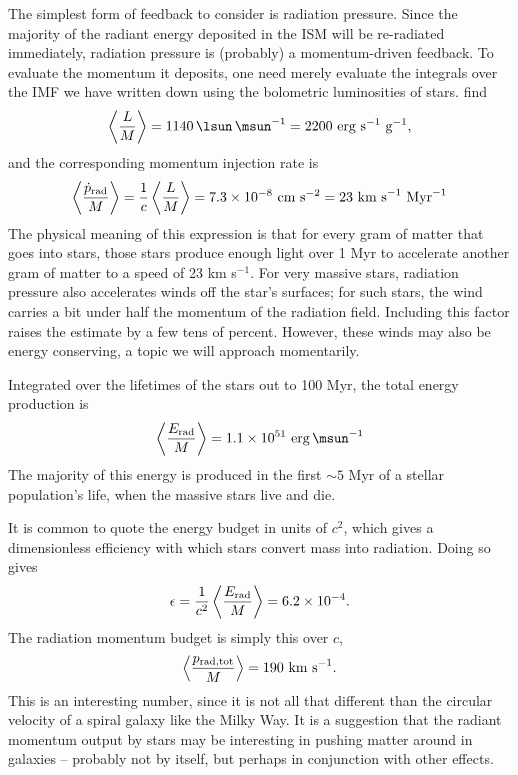 The simplest form of feedback to consider is radiation pressure. Since the majority of the radiant energy deposited in the ISM will be re-radiated immediately, radiation pressure is (probably) a momentum-driven feedback. To evaluate the momentum it deposits, one need merely evaluate the integrals over the IMF we have written down using the bolometric luminosities of stars. \citet{murray10b} find
\begin{equation}
\left\langle \frac{L}{M}\right \rangle = 1140 \,\lsun\,\msun^{-1} = 2200\mbox{ erg s}^{-1}\mbox{ g}^{-1},
\end{equation}
and the corresponding momentum injection rate is
\begin{equation}
\left\langle \frac{\dot{p}_{\rm rad}}{M}\right \rangle = \frac{1}{c} \left\langle \frac{L}{M}\right \rangle = 7.3\times 10^{-8}\mbox{ cm s}^{-2} = 23\mbox{ km s}^{-1}\mbox{ Myr}^{-1}
\end{equation}
The physical meaning of this expression is that for every gram of matter that goes into stars, those stars produce enough light over 1 Myr to accelerate another gram of matter to a speed of 23 km s$^{-1}$. For very massive stars, radiation pressure also accelerates winds off the star's surfaces; for such stars, the wind carries a bit under half the momentum of the radiation field. Including this factor raises the estimate by a few tens of percent.  However, these winds may also be energy conserving, a topic we will approach momentarily.

Integrated over the lifetimes of the stars out to 100 Myr, the total energy production is
\begin{equation}
\left\langle \frac{E_{\rm rad}}{M}\right\rangle = 1.1\times 10^{51}\mbox{ erg}\,\msun^{-1}
\end{equation}
The majority of this energy is produced in the first $\sim 5$ Myr of a stellar population's life, when the massive stars live and die.

It is common to quote the energy budget in units of $c^2$, which gives a dimensionless efficiency with which stars convert mass into radiation. Doing so gives
\begin{equation}
\epsilon = \frac{1}{c^2} \left\langle \frac{E_{\rm rad}}{M}\right\rangle = 6.2\times 10^{-4}.
\end{equation}
The radiation momentum budget is simply this over $c$,
\begin{equation}
\left\langle \frac{p_{\rm rad,tot}}{M}\right\rangle = 190\mbox{ km s}^{-1}.
\end{equation}
This is an interesting number, since it is not all that different than the circular velocity of a spiral galaxy like the Milky Way. It is a suggestion that the radiant momentum output by stars may be interesting in pushing matter around in galaxies -- probably not by itself, but perhaps in conjunction with other effects.

